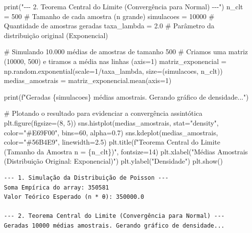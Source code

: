 \documentclass[
  brazilian,
  letterpaper,
  DIV=11,
  numbers=noendperiod]{scrreprt}
\newenvironment{Shaded}{\begin{snugshade}}{\end{snugshade}}
\newcommand{\BuiltInTok}[1]{\textcolor[rgb]{0.00,0.23,0.31}{#1}}
\newcommand{\CommentTok}[1]{\textcolor[rgb]{0.37,0.37,0.37}{#1}}
\newcommand{\DecValTok}[1]{\textcolor[rgb]{0.68,0.00,0.00}{#1}}
\newcommand{\FloatTok}[1]{\textcolor[rgb]{0.68,0.00,0.00}{#1}}
\newcommand{\NormalTok}[1]{\textcolor[rgb]{0.00,0.23,0.31}{#1}}
\newcommand{\OperatorTok}[1]{\textcolor[rgb]{0.37,0.37,0.37}{#1}}
\newcommand{\SpecialCharTok}[1]{\textcolor[rgb]{0.37,0.37,0.37}{#1}}
\newcommand{\SpecialStringTok}[1]{\textcolor[rgb]{0.13,0.47,0.30}{#1}}
\newcommand{\StringTok}[1]{\textcolor[rgb]{0.13,0.47,0.30}{#1}}
\begin{document}
\begin{Shaded}
\begin{Highlighting}[]
\BuiltInTok{print}\NormalTok{(}\StringTok{"{-}{-}{-} 2. Teorema Central do Limite (Convergência para Normal) {-}{-}{-}"}\NormalTok{)}
\NormalTok{n\_clt }\OperatorTok{=} \DecValTok{500}             \CommentTok{\# Tamanho de cada amostra (n grande)}
\NormalTok{simulacoes }\OperatorTok{=} \DecValTok{10000}      \CommentTok{\# Quantidade de amostras geradas}
\NormalTok{taxa\_lambda }\OperatorTok{=} \FloatTok{2.0}       \CommentTok{\# Parâmetro da distribuição original (Exponencial)}

\CommentTok{\# Simulando 10.000 médias de amostras de tamanho 500}
\CommentTok{\# Criamos uma matriz (10000, 500) e tiramos a média nas linhas (axis=1)}
\NormalTok{matriz\_exponencial }\OperatorTok{=}\NormalTok{ np.random.exponential(scale}\OperatorTok{=}\DecValTok{1}\OperatorTok{/}\NormalTok{taxa\_lambda, size}\OperatorTok{=}\NormalTok{(simulacoes, n\_clt))}
\NormalTok{medias\_amostrais }\OperatorTok{=}\NormalTok{ matriz\_exponencial.mean(axis}\OperatorTok{=}\DecValTok{1}\NormalTok{)}

\BuiltInTok{print}\NormalTok{(}\SpecialStringTok{f"Geradas }\SpecialCharTok{\{}\NormalTok{simulacoes}\SpecialCharTok{\}}\SpecialStringTok{ médias amostrais. Gerando gráfico de densidade..."}\NormalTok{)}

\CommentTok{\# Plotando o resultado para evidenciar a convergência assintótica}
\NormalTok{plt.figure(figsize}\OperatorTok{=}\NormalTok{(}\DecValTok{8}\NormalTok{, }\DecValTok{5}\NormalTok{))}
\NormalTok{sns.histplot(medias\_amostrais, stat}\OperatorTok{=}\StringTok{"density"}\NormalTok{, color}\OperatorTok{=}\StringTok{"\#E69F00"}\NormalTok{, bins}\OperatorTok{=}\DecValTok{60}\NormalTok{, alpha}\OperatorTok{=}\FloatTok{0.7}\NormalTok{)}
\NormalTok{sns.kdeplot(medias\_amostrais, color}\OperatorTok{=}\StringTok{"\#56B4E9"}\NormalTok{, linewidth}\OperatorTok{=}\FloatTok{2.5}\NormalTok{)}
\NormalTok{plt.title(}\SpecialStringTok{f"Teorema Central do Limite (Tamanho da Amostra n = }\SpecialCharTok{\{}\NormalTok{n\_clt}\SpecialCharTok{\}}\SpecialStringTok{)"}\NormalTok{, fontsize}\OperatorTok{=}\DecValTok{14}\NormalTok{)}
\NormalTok{plt.xlabel(}\StringTok{"Médias Amostrais (Distribuição Original: Exponencial)"}\NormalTok{)}
\NormalTok{plt.ylabel(}\StringTok{"Densidade"}\NormalTok{)}
\NormalTok{plt.show()}
\end{Highlighting}
\end{Shaded}

\begin{verbatim}
--- 1. Simulação da Distribuição de Poisson ---
Soma Empírica do array: 350581
Valor Teórico Esperado (n * θ): 350000.0

--- 2. Teorema Central do Limite (Convergência para Normal) ---
Geradas 10000 médias amostrais. Gerando gráfico de densidade...
\end{verbatim}
\end{document}
